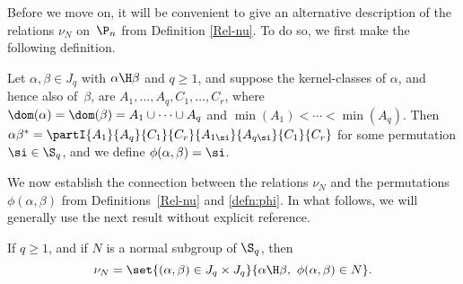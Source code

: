 Before we move on, it will be convenient to give an alternative description of the relations $\nu_N$ on~$\P_n$ from Definition \ref{Rel-nu}.  To do so, we first make the following definition.

\begin{definition}\label{defn:phi}
Let $\alpha,\beta\in J_q$ with $\alpha\H\beta$ and $q\geq1$, and suppose the kernel-classes of $\alpha$, and hence also of~$\beta$, are $A_1,\ldots,A_q,C_1,\ldots,C_r$, where $\dom(\alpha)=\dom(\beta)=A_1\cup\cdots\cup A_q$ and $\min(A_1)<\cdots<\min(A_q)$.  Then
$\alpha\beta^* = \partI{A_1}{A_q}{C_1}{C_r}{A_{1\si}}{A_{q\si}}{C_1}{C_r}$ for some permutation $\si\in\S_q$, and we define $\phi(\alpha,\beta)=\si$.  
\end{definition}

We now establish the connection between the relations $\nu_N$ and the permutations $\phi(\alpha,\beta)$ from Definitions~\ref{Rel-nu} and \ref{defn:phi}.  In what follows, we will generally use the next result without explicit reference.

\begin{lemma}\label{lem:nu_phi}
If $q\geq1$, and if $N$ is a normal subgroup of $\S_q$, then
\[
\nu_N=\set{ (\alpha,\beta)\in J_q\times J_q}{\alpha\H \beta,\ \phi(\alpha,\beta)\in N}.
\]
\end{lemma}

